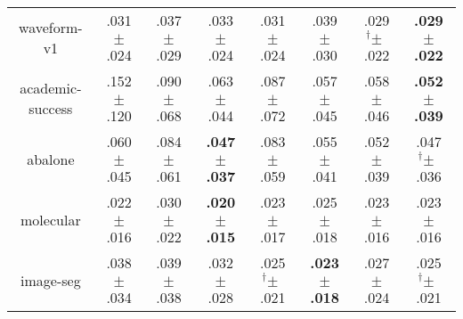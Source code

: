 \begin{tabular}{|c|ccccccc|}
waveform-v1 & .031$^{\phantom{\dag}}\pm^{\phantom{\dag}}$.024\cellcolor{green!24} & .037$^{\phantom{\dag}}\pm^{\phantom{\dag}}$.029\cellcolor{red!18} & .033$^{\phantom{\dag}}\pm^{\phantom{\dag}}$.024\cellcolor{green!11} & .031$^{\phantom{\dag}}\pm^{\phantom{\dag}}$.024\cellcolor{green!24} & .039$^{\phantom{\dag}}\pm^{\phantom{\dag}}$.030\cellcolor{red!40} & .029$^{\dag}\pm^{\phantom{\dag}}$.022\cellcolor{green!39} & \textbf{.029$^{\phantom{\dag}}\pm^{\phantom{\dag}}$.022}\cellcolor{green!40} \\
academic-success & .152$^{\phantom{\dag}}\pm^{\phantom{\dag}}$.120\cellcolor{red!40} & .090$^{\phantom{\dag}}\pm^{\phantom{\dag}}$.068\cellcolor{green!9} & .063$^{\phantom{\dag}}\pm^{\phantom{\dag}}$.044\cellcolor{green!31} & .087$^{\phantom{\dag}}\pm^{\phantom{\dag}}$.072\cellcolor{green!12} & .057$^{\phantom{\dag}}\pm^{\phantom{\dag}}$.045\cellcolor{green!35} & .058$^{\phantom{\dag}}\pm^{\phantom{\dag}}$.046\cellcolor{green!35} & \textbf{.052$^{\phantom{\dag}}\pm^{\phantom{\dag}}$.039}\cellcolor{green!40} \\
abalone & .060$^{\phantom{\dag}}\pm^{\phantom{\dag}}$.045\cellcolor{green!11} & .084$^{\phantom{\dag}}\pm^{\phantom{\dag}}$.061\cellcolor{red!40} & \textbf{.047$^{\phantom{\dag}}\pm^{\phantom{\dag}}$.037}\cellcolor{green!40} & .083$^{\phantom{\dag}}\pm^{\phantom{\dag}}$.059\cellcolor{red!39} & .055$^{\phantom{\dag}}\pm^{\phantom{\dag}}$.041\cellcolor{green!22} & .052$^{\phantom{\dag}}\pm^{\phantom{\dag}}$.039\cellcolor{green!27} & .047$^{\dag}\pm^{\phantom{\dag}}$.036\cellcolor{green!39} \\
molecular & .022$^{\phantom{\dag}}\pm^{\phantom{\dag}}$.016\cellcolor{green!25} & .030$^{\phantom{\dag}}\pm^{\phantom{\dag}}$.022\cellcolor{red!40} & \textbf{.020$^{\phantom{\dag}}\pm^{\phantom{\dag}}$.015}\cellcolor{green!40} & .023$^{\phantom{\dag}}\pm^{\phantom{\dag}}$.017\cellcolor{green!14} & .025$^{\phantom{\dag}}\pm^{\phantom{\dag}}$.018\cellcolor{red!3} & .023$^{\phantom{\dag}}\pm^{\phantom{\dag}}$.016\cellcolor{green!18} & .023$^{\phantom{\dag}}\pm^{\phantom{\dag}}$.016\cellcolor{green!18} \\
image-seg & .038$^{\phantom{\dag}}\pm^{\phantom{\dag}}$.034\cellcolor{red!36} & .039$^{\phantom{\dag}}\pm^{\phantom{\dag}}$.038\cellcolor{red!40} & .032$^{\phantom{\dag}}\pm^{\phantom{\dag}}$.028\cellcolor{red!4} & .025$^{\dag}\pm^{\phantom{\dag}}$.021\cellcolor{green!30} & \textbf{.023$^{\phantom{\dag}}\pm^{\phantom{\dag}}$.018}\cellcolor{green!40} & .027$^{\phantom{\dag}}\pm^{\phantom{\dag}}$.024\cellcolor{green!20} & .025$^{\dag}\pm^{\phantom{\dag}}$.021\cellcolor{green!31} \\

\end{tabular}
